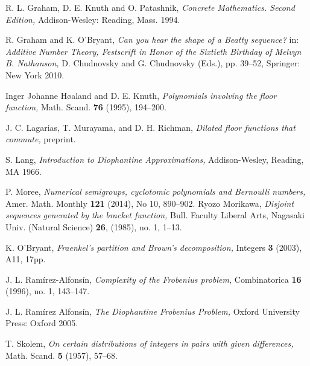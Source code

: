 \documentclass[12pt,letterpaper, reqno]{amsart}
\theoremstyle{definition}
\theoremstyle{remark}
\begin{document}
\begin{thebibliography}{99}
R. L. Graham, D. E. Knuth and O. Patashnik,
\emph{Concrete Mathematics. Second Edition,}
Addison-Wesley: Reading, Mass. 1994.



R. Graham and K. O'Bryant,
\emph{Can you hear the shape of a Beatty sequence?}
in: {\em Additive Number Theory, Festscrift in Honor of the Sixtieth Birthday
of Melvyn B. Nathanson,} D. Chudnovsky and G. Chudnovsky (Eds.),
pp. 39--52, Springer: New York 2010. 
 
 
 Inger Johanne H\o{a}land and D. E. Knuth,
 \emph{Polynomials involving the floor function,}
 Math. Scand. {\bf 76} (1995), 194--200.

 J. C. Lagarias, T. Murayama, and D. H. Richman,
 \emph{Dilated floor functions that commute,} preprint.
 
 S. Lang,
 \emph{Introduction to Diophantine Approximations,}
 Addison-Wesley, Reading, MA 1966.
 
 P. Moree,
 \emph{Numerical semigroups, cyclotomic polynomials and Bernoulli numbers,}
 Amer. Math. Monthly {\bf 121} (2014), No 10, 890--902.
 Ryozo Morikawa,
 \emph{Disjoint sequences generated by the bracket function,}
 Bull. Faculty Liberal Arts, Nagasaki Univ. (Natural Science) {\bf 26}, (1985), no. 1, 1--13.
 
 K. O'Bryant,
 \emph{Fraenkel's partition and Brown's decomposition,}
 Integers {\bf 3} (2003), A11, 17pp.
 
 J. L. Ram\'{i}rez-Alfons\'{i}n,
 \emph{Complexity of the Frobenius problem,}
 Combinatorica {\bf 16} (1996), no. 1, 143--147.
 
 J. L. Ram\'{i}rez Alfons\'{i}n,
 \emph{The Diophantine Frobenius Problem,}
 Oxford University Press: Oxford 2005.
 
 T. Skolem,
 \emph{On certain distributions of integers in pairs with given differences,}
 Math. Scand. {\bf 5} (1957), 57--68.
 

\end{thebibliography}
\end{document}
